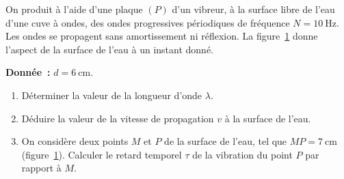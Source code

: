 \begin{minipage}{0.63\linewidth}
On produit à l'aide d'une plaque $(P)$ d'un vibreur, à la surface libre de l'eau
d'une cuve à ondes, des ondes progressives périodiques de fréquence
$N=\qty{10}{\hertz}$. Les ondes se propagent sans amortissement ni réflexion. La
figure~\ref{fig:cuve_surface_eau} donne l'aspect de la surface de l'eau à un
instant donné.

\textbf{Donnée~:} $d=\qty{6}{\cm}$.
\begin{enumerate}
    \item Déterminer la valeur de la longueur d'onde $\lambda$.
    \item Déduire la valeur de la vitesse de propagation $v$ à la surface de
          l'eau.
    \item On considère deux points $M$ et $P$ de la surface de l'eau, tel que
          $MP=\qty{7}{\cm}$ (figure~\ref{fig:cuve_surface_eau}). Calculer le
          retard temporel $\tau$ de la vibration du point $P$ par rapport à $M$.
\end{enumerate}
\end{minipage}
\hfill
\begin{minipage}{0.36\linewidth}
    \begin{figure}[H]
        \centering
        \caption{}
        \label{fig:cuve_surface_eau}
    \end{figure}
\end{minipage}

